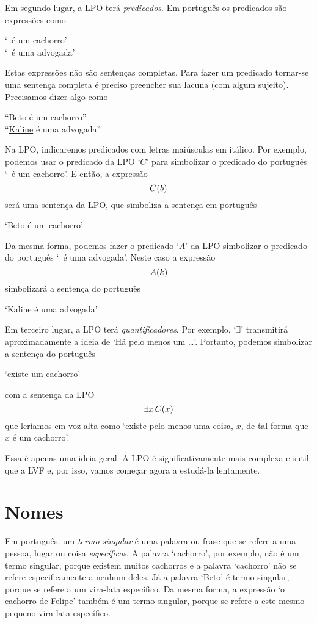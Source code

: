 Em segundo lugar, a LPO terá \emph{predicados}.
Em português os predicados são expressões como
\begin{center}
`\blank\ é um cachorro'\\ `\blank\ é uma advogada'
\end{center}
Estas expressões não são sentenças completas.
Para fazer um predicado tornar-se uma sentença completa é preciso preencher sua lacuna (com algum sujeito).
Precisamos dizer algo como
\begin{center}
``\underline{Beto} é um cachorro''\\
``\underline{Kaline} é uma advogada''
\end{center}
Na LPO, indicaremos predicados com letras maiúsculas em itálico.
Por exemplo, podemos usar o predicado da LPO `$C$' para simbolizar o predicado do português `\blank\ é um cachorro'.
E então, a expressão
$$\mathord{C}(b)$$
será uma sentença da LPO, que simboliza a sentença em português
\begin{center}
`Beto é um cachorro'
\end{center}
Da mesma forma, podemos fazer o predicado `$A$' da LPO simbolizar o predicado do português `\blank\ é uma advogada'.
Neste caso a expressão
$$\mathord{A}(k)$$
simbolizará a sentença do português
\begin{center}
`Kaline é uma advogada'
\end{center}
Em terceiro lugar, a LPO terá \emph{quantificadores}.
Por exemplo, `$\exists$' transmitirá aproximadamente a ideia de `Há pelo menos um \ldots'.
Portanto, podemos simbolizar a sentença do português
\begin{center}
`existe um cachorro'
\end{center}
com a sentença da LPO
$$\exists x\, \mathord{C}(x)$$
que leríamos em voz alta como `existe pelo menos uma coisa, $x$, de tal forma que $x$ é um cachorro'.

Essa é apenas uma ideia geral.
A LPO é significativamente mais complexa e sutil que a LVF e, por isso, vamos começar agora a estudá-la lentamente.


\section{Nomes}
Em português, um \emph{termo singular} é uma palavra ou frase que se refere a uma pessoa, lugar ou coisa \emph{específicos}.
A palavra `cachorro', por exemplo, não é um termo singular, porque existem muitos cachorros e a palavra `cachorro' não se refere especificamente a nenhum deles.
Já a palavra `Beto' é termo singular, porque se refere a um vira-lata específico.
Da mesma forma, a expressão `o cachorro de Felipe' também é um termo singular, porque se refere a este mesmo  pequeno vira-lata específico.

